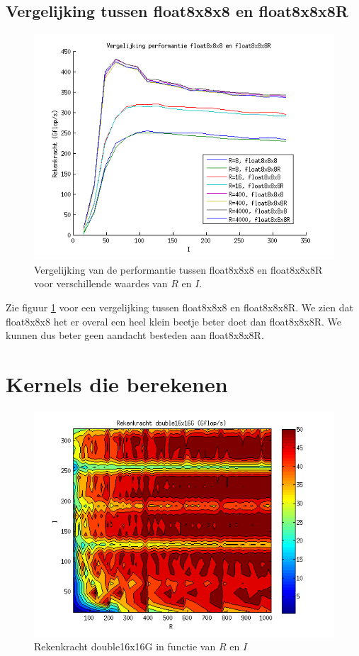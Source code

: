\subsection{Vergelijking tussen float8x8x8 en float8x8x8R}

\begin{figure}[h!]
\centering
\includegraphics{fl8_vs_fl8R}
\caption{\label{fl8_vs_fl8R} Vergelijking van de performantie tussen float8x8x8 en float8x8x8R voor verschillende waardes van $R$ en $I$.}
\end{figure}

Zie figuur \ref{fl8_vs_fl8R} voor een vergelijking tussen float8x8x8 en float8x8x8R. We zien dat float8x8x8 het er overal een heel klein beetje beter doet dan float8x8x8R. We kunnen dus beter geen aandacht besteden aan float8x8x8R.

\section{Kernels die \GGG{} berekenen}
\begin{figure}[h!]
\centering
\includegraphics{result_gradient}
\caption{\label{result_gradient} Rekenkracht double16x16G in functie van $R$ en $I$}
\end{figure}

